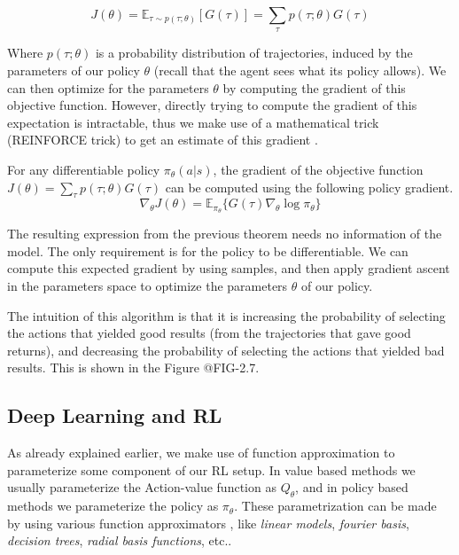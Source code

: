 \begin{equation}
    J(\theta) = \mathbb{E}_{\tau \sim p(\tau;\theta)}[G(\tau)] = \sum_{\tau} p(\tau;\theta) G(\tau)
\end{equation}

Where $p(\tau;\theta)$ is a probability distribution of trajectories, induced by
the parameters of our policy $\theta$ (recall that the agent sees what its policy allows).
We can then optimize for the parameters $\theta$ by computing the gradient of this
objective function. However, directly trying to compute the gradient of this expectation
is intractable, thus we make use of a mathematical trick (REINFORCE trick) to get an estimate of this gradient \citep{PGSutton}. 

\begin{theorem}
    For any differentiable policy $\pi_{\theta}(a|s)$, the gradient of the
    objective function $J(\theta) = \sum_{\tau} p(\tau;\theta) G(\tau)$ 
    can be computed using the following policy gradient.
    \begin{equation}
        \nabla_{\theta} J(\theta) = \mathbb{E}_{\pi_{\theta}} \lbrace G(\tau) \nabla_{\theta} \log \pi_{\theta} \rbrace
    \end{equation}
\end{theorem}

The resulting expression from the previous theorem needs no information of the model.
The only requirement is for the policy to be differentiable. We can compute this expected
gradient by using samples, and then apply gradient ascent in the parameters space to optimize 
the parameters $\theta$ of our policy.

The intuition of this algorithm is that it is increasing the probability of selecting
the actions that yielded good results (from the trajectories that gave good returns), 
and decreasing the probability of selecting the actions that yielded bad results. This
is shown in the Figure @FIG-2.7.

\figRlPolicyGradientsIntuition

\subsection{Deep Learning and RL}
As already explained earlier, we make use of function approximation to parameterize
some component of our RL setup. In value based methods we usually parameterize the
Action-value function as $Q_{\theta}$, and in policy based methods we parameterize
the policy as $\pi_{\theta}$. These parametrization can be made by using various
function approximators , like \textit{linear models}, \textit{fourier basis}, 
\textit{decision trees}, \textit{radial basis functions}, etc..

